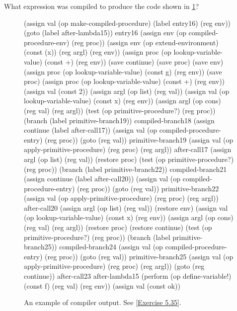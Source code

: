 \begin{exercise}
	\label{Exercise 5.35}
	What expression was compiled to produce the code shown in \cref{Figure 5.18}?
\end{exercise}



\begin{figure}
	\begin{smallscheme}
	  (assign val
	          (op make-compiled-procedure)
	          (label entry16)
	          (reg env))
	    (goto (label after-lambda15))
	  entry16
	    (assign env (op compiled-procedure-env) (reg proc))
	    (assign env
	            (op extend-environment)
	            (const (x))
	            (reg argl)
	            (reg env))
	    (assign proc
	            (op lookup-variable-value)
	            (const +)
	            (reg env))
	    (save continue)
	    (save proc)
	    (save env)
	    (assign proc
	            (op lookup-variable-value)
	            (const g)
	            (reg env))
	    (save proc)
	    (assign proc
	            (op lookup-variable-value)
	            (const +)
	            (reg env))
	    (assign val (const 2))
	    (assign argl (op list) (reg val))
	    (assign val
	            (op lookup-variable-value)
	            (const x)
	            (reg env))
	    (assign argl (op cons) (reg val) (reg argl))
	    (test (op primitive-procedure?) (reg proc))
	    (branch (label primitive-branch19))
	  compiled-branch18
	    (assign continue (label after-call17))
	    (assign val (op compiled-procedure-entry) (reg proc))
	    (goto (reg val))
	  primitive-branch19
	    (assign val
	            (op apply-primitive-procedure)
	            (reg proc)
	            (reg argl))
	  after-call17
	    (assign argl (op list) (reg val))
	    (restore proc)
	    (test (op primitive-procedure?) (reg proc))
	    (branch (label primitive-branch22))
	  compiled-branch21
	    (assign continue (label after-call20))
	    (assign val (op compiled-procedure-entry) (reg proc))
	    (goto (reg val))
	  primitive-branch22
	    (assign val
	            (op apply-primitive-procedure)
	            (reg proc)
	            (reg argl))
	  after-call20
	    (assign argl (op list) (reg val))
	    (restore env)
	    (assign val
	            (op lookup-variable-value)
	            (const x)
	            (reg env))
	    (assign argl (op cons) (reg val) (reg argl))
	    (restore proc)
	    (restore continue)
	    (test (op primitive-procedure?) (reg proc))
	    (branch (label primitive-branch25))
	  compiled-branch24
	    (assign val
	            (op compiled-procedure-entry)
	            (reg proc))
	    (goto (reg val))
	  primitive-branch25
	    (assign val
	            (op apply-primitive-procedure)
	            (reg proc)
	            (reg argl))
	    (goto (reg continue))
	  after-call23
	  after-lambda15
	    (perform (op define-variable!)
	             (const f)
	             (reg val)
	             (reg env))
	    (assign val (const ok))
	\end{smallscheme}
	\caption{
		An example of compiler output.
		See \cref{Exercise 5.35}.
	}
	\label{Figure 5.18}
\end{figure}



